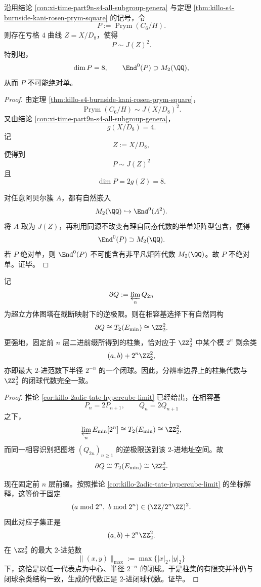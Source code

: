 \begin{theorem}\label{thm:xi-time-part9zo-prym-c6h-not-absolutely-simple}
沿用结论 \ref{con:xi-time-part9n-s4-all-subgroup-genera} 与定理 \ref{thm:killo-s4-burnside-kani-rosen-prym-square} 的记号，令
\[
P:=\operatorname{Prym}(C_6/H).
\]
则存在亏格 \(4\) 曲线 \(Z=X/D_8\)，使得
\[
P\sim J(Z)^2.
\]
特别地，
\[
\dim P=8,
\qquad
\End^0(P)\supset M_2(\QQ),
\]
从而 \(P\) 不可能绝对单。
\end{theorem}
\begin{proof}
由定理 \ref{thm:killo-s4-burnside-kani-rosen-prym-square}，
\[
\operatorname{Prym}(C_6/H)\sim J(X/D_8)^2.
\]
又由结论 \ref{con:xi-time-part9n-s4-all-subgroup-genera}，
\[
g(X/D_8)=4.
\]
记
\[
Z:=X/D_8,
\]
便得到
\[
P\sim J(Z)^2
\]
且
\[
\dim P=2g(Z)=8.
\]

对任意阿贝尔簇 \(A\)，都有自然嵌入
\[
M_2(\QQ)\hookrightarrow \End^0(A^2).
\]
将 \(A\) 取为 \(J(Z)\)，再利用同源不改变有理自同态代数的半单矩阵型包含，便得
\[
\End^0(P)\supset M_2(\QQ).
\]
若 \(P\) 绝对单，则 \(\End^0(P)\) 不可能含有非平凡矩阵代数 \(M_2(\QQ)\)。故 \(P\) 不绝对单。证毕。
\end{proof}

\begin{theorem}\label{thm:xi-time-part9zo-dyadic-boundary-cylinder-ball-identification}
记
\[
\partial Q:=\varprojlim_n Q_{2n}
\]
为超立方体图塔在截断映射下的逆极限。则在相容基选择下有自然同构
\[
\partial Q\cong T_2(E_{\min})\cong \ZZ_2^2.
\]
更强地，固定前 \(n\) 层二进前缀所得到的柱集，恰对应于 \(\ZZ_2^2\) 中某个模 \(2^n\) 剩余类
\[
(a,b)+2^n\ZZ_2^2,
\]
亦即最大 \(2\)-进范数下半径 \(2^{-n}\) 的一个闭球。因此，分辨率边界上的柱集代数与 \(\ZZ_2^2\) 的闭球代数完全一致。
\end{theorem}
\begin{proof}
推论 \ref{cor:killo-2adic-tate-hypercube-limit} 已经给出，在相容基
\[
P_n=2P_{n+1},
\qquad
Q_n=2Q_{n+1}
\]
之下，
\[
\varprojlim_n E_{\min}[2^n]\cong T_2(E_{\min})\cong \ZZ_2^2,
\]
而同一相容识别把图塔 \((Q_{2n})_{n\ge 1}\) 的逆极限送到该 \(2\)-进地址空间。故
\[
\partial Q\cong T_2(E_{\min})\cong \ZZ_2^2.
\]

现在固定前 \(n\) 层前缀。按照推论 \ref{cor:killo-2adic-tate-hypercube-limit} 的坐标解释，这等价于固定
\[
(a\bmod 2^n,\ b\bmod 2^n)\in (\ZZ/2^n\ZZ)^2.
\]
因此对应子集正是
\[
(a,b)+2^n\ZZ_2^2.
\]
在 \(\ZZ_2^2\) 的最大 \(2\)-进范数
\[
\|(x,y)\|_{\max}:=\max\{|x|_2,|y|_2\}
\]
下，这恰是以任一代表点为中心、半径 \(2^{-n}\) 的闭球。于是柱集的有限交并补仍与闭球余类结构一致，生成的代数正是 \(2\)-进闭球代数。证毕。
\end{proof}

\endinput
